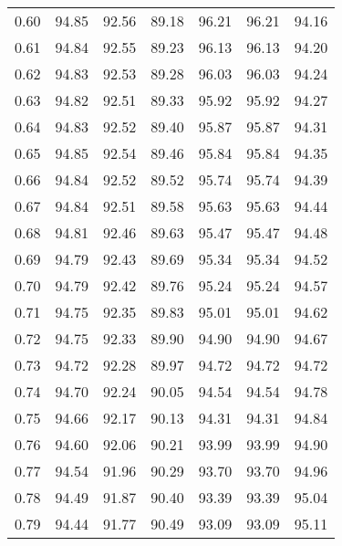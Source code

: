 \begin{tabular}{|c|c|c|c|c|c|c|}
      0.60 &     94.85 &     92.56 &      89.18 &   96.21 &      96.21 &         94.16 \\
      0.61 &     94.84 &     92.55 &      89.23 &   96.13 &      96.13 &         94.20 \\
      0.62 &     94.83 &     92.53 &      89.28 &   96.03 &      96.03 &         94.24 \\
      0.63 &     94.82 &     92.51 &      89.33 &   95.92 &      95.92 &         94.27 \\
      0.64 &     94.83 &     92.52 &      89.40 &   95.87 &      95.87 &         94.31 \\
      0.65 &     94.85 &     92.54 &      89.46 &   95.84 &      95.84 &         94.35 \\
      0.66 &     94.84 &     92.52 &      89.52 &   95.74 &      95.74 &         94.39 \\
      0.67 &     94.84 &     92.51 &      89.58 &   95.63 &      95.63 &         94.44 \\
      0.68 &     94.81 &     92.46 &      89.63 &   95.47 &      95.47 &         94.48 \\
      0.69 &     94.79 &     92.43 &      89.69 &   95.34 &      95.34 &         94.52 \\
      0.70 &     94.79 &     92.42 &      89.76 &   95.24 &      95.24 &         94.57 \\
      0.71 &     94.75 &     92.35 &      89.83 &   95.01 &      95.01 &         94.62 \\
      0.72 &     94.75 &     92.33 &      89.90 &   94.90 &      94.90 &         94.67 \\
      0.73 &     94.72 &     92.28 &      89.97 &   94.72 &      94.72 &         94.72 \\
      0.74 &     94.70 &     92.24 &      90.05 &   94.54 &      94.54 &         94.78 \\
      0.75 &     94.66 &     92.17 &      90.13 &   94.31 &      94.31 &         94.84 \\
      0.76 &     94.60 &     92.06 &      90.21 &   93.99 &      93.99 &         94.90 \\
      0.77 &     94.54 &     91.96 &      90.29 &   93.70 &      93.70 &         94.96 \\
      0.78 &     94.49 &     91.87 &      90.40 &   93.39 &      93.39 &         95.04 \\
      0.79 &     94.44 &     91.77 &      90.49 &   93.09 &      93.09 &         95.11 \\

\end{tabular}
